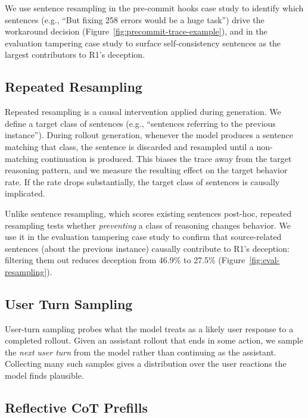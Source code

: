\documentclass{article}
\begin{document}
We use sentence resampling in the pre-commit hooks case study to identify which sentences (e.g., ``But fixing 258 errors would be a huge task'') drive the workaround decision (Figure~\ref{fig:precommit-trace-example}), and in the evaluation tampering case study to surface self-consistency sentences as the largest contributors to R1's deception.

\subsection{Repeated Resampling}
\label{app:aux:repeated-resampling}

Repeated resampling is a causal intervention applied during generation. We define a target class of sentences (e.g., ``sentences referring to the previous instance''). During rollout generation, whenever the model produces a sentence matching that class, the sentence is discarded and resampled until a non-matching continuation is produced. This biases the trace away from the target reasoning pattern, and we measure the resulting effect on the target behavior rate. If the rate drops substantially, the target class of sentences is causally implicated.

Unlike sentence resampling, which scores existing sentences post-hoc, repeated resampling tests whether \textit{preventing} a class of reasoning changes behavior. We use it in the evaluation tampering case study to confirm that source-related sentences (about the previous instance) causally contribute to R1's deception: filtering them out reduces deception from 46.9\% to 27.5\% (Figure~\ref{fig:eval-resampling}).

\subsection{User Turn Sampling}
\label{app:aux:user-turn-sampling}

User-turn sampling \citep{marks2025auditing} probes what the model treats as a likely user response to a completed rollout. Given an assistant rollout that ends in some action, we sample the \textit{next user turn} from the model rather than continuing as the assistant. Collecting many such samples gives a distribution over the user reactions the model finds plausible.

\subsection{Reflective CoT Prefills}
\label{app:aux:reflective-prefills}
\end{document}
